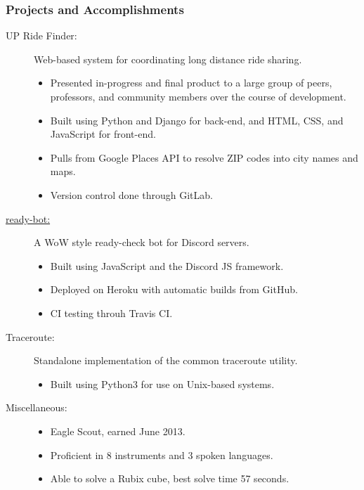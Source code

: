 \documentclass{article}
\begin{document}
\subsubsection*{Projects and Accomplishments}
    \begin{description}
        \item[UP Ride Finder:] Web-based system for coordinating long distance ride sharing.
            \begin{itemize}
                \item Presented in-progress and final product to a large group of peers, professors, and community members over the course of development.
                \item Built using Python and Django for back-end, and HTML, CSS, and JavaScript for front-end.
                \item Pulls from Google Places API to resolve ZIP codes into city names and maps.
                \item Version control done through GitLab.
            \end{itemize}

            \vspace{0.5em}

        \item[\href{https://github.com/BurnsCommaLucas/ready-bot}{ready-bot:}] A WoW style ready-check bot for Discord servers.
            \begin{itemize}
                \item Built using JavaScript and the Discord JS framework.
                \item Deployed on Heroku with automatic builds from GitHub.
                \item CI testing throuh Travis CI.
            \end{itemize}

            \vspace{0.5em}

        \item[Traceroute:] Standalone implementation of the common traceroute utility.
            \begin{itemize}
                \item Built using Python3 for use on Unix-based systems.
            \end{itemize}

            \vspace{0.5em}

        \item[Miscellaneous:] \hfill
            \begin{itemize}
                \item Eagle Scout, earned June 2013.
                \item Proficient in 8 instruments and 3 spoken languages.
                \item Able to solve a Rubix cube, best solve time 57 seconds.
        \end{itemize}
    \end{description}
\end{document}
